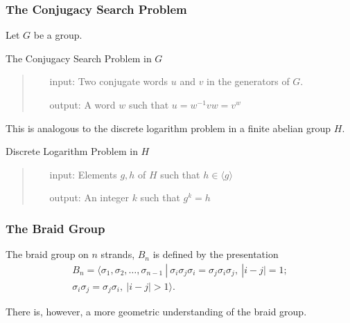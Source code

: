 \documentclass{beamer}
\begin{document}
\begin{frame}
	\frametitle{The Conjugacy Search Problem}
	Let $G$ be a group.\pause
	\begin{block}{The Conjugacy Search Problem in $G$}
		\begin{quote}
			\begin{itemize}
				\item[input: ]Two conjugate words $u$ and $v$ in the generators of $G$.
				\item[output: ]A word $w$ such that $u = w^{-1}vw = v^w$
			\end{itemize}
		\end{quote}
	\end{block}\pause
	This is analogous to the discrete logarithm problem in a finite abelian group $H$.\pause
	\begin{block}{Discrete Logarithm Problem in $H$}
		\begin{quote}
			\begin{itemize}
				\item[input: ]Elements $g,h$ of $H$ such that $h\in \langle g\rangle$
				\item[output: ]An integer $k$ such that $g^k = h$
			\end{itemize}
		\end{quote}
	\end{block}
\end{frame}

\begin{frame}
	\frametitle{The Braid Group}
	\begin{definition}
		The braid group on $n$ strands, $B_n$ is defined by the presentation
		\begin{multline*}
		B_n = \langle \sigma_1, \sigma_2, \ldots, \sigma_{n-1}\ |\ \sigma_i\sigma_j\sigma_i = \sigma_j\sigma_i\sigma_j,\ |i-j|=1;\\ \sigma_i\sigma_j = \sigma_j\sigma_i,\ |i-j|>1\rangle.
		\end{multline*}
	\end{definition}\pause
	There is, however, a more geometric understanding of the braid group.
\end{frame}
\end{document}
